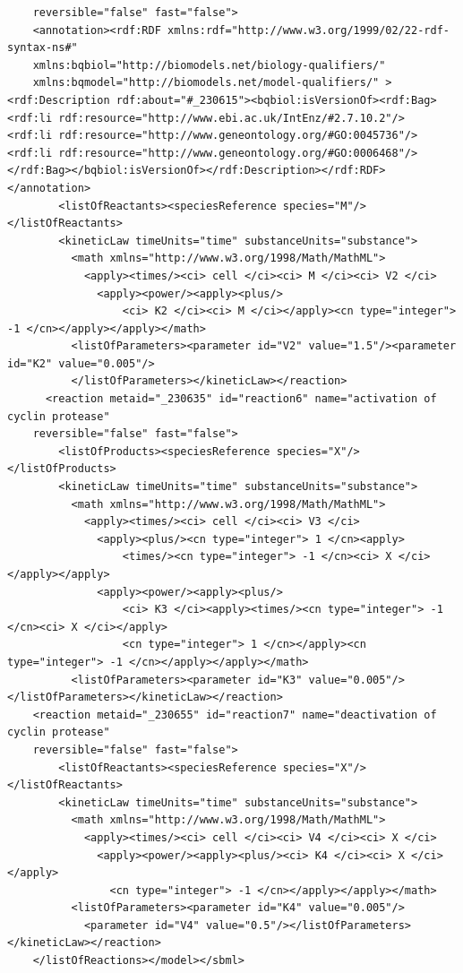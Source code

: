 \documentclass[a4paper,10pt,titlepage]{article}
\begin{document}
\begin{verbatim}
	reversible="false" fast="false">
	<annotation><rdf:RDF xmlns:rdf="http://www.w3.org/1999/02/22-rdf-syntax-ns#" 
	xmlns:bqbiol="http://biomodels.net/biology-qualifiers/" 
	xmlns:bqmodel="http://biomodels.net/model-qualifiers/" >
<rdf:Description rdf:about="#_230615"><bqbiol:isVersionOf><rdf:Bag>
<rdf:li rdf:resource="http://www.ebi.ac.uk/IntEnz/#2.7.10.2"/>
<rdf:li rdf:resource="http://www.geneontology.org/#GO:0045736"/>
<rdf:li rdf:resource="http://www.geneontology.org/#GO:0006468"/>
</rdf:Bag></bqbiol:isVersionOf></rdf:Description></rdf:RDF></annotation>
        <listOfReactants><speciesReference species="M"/></listOfReactants>
        <kineticLaw timeUnits="time" substanceUnits="substance">
          <math xmlns="http://www.w3.org/1998/Math/MathML">
            <apply><times/><ci> cell </ci><ci> M </ci><ci> V2 </ci>
              <apply><power/><apply><plus/>
                  <ci> K2 </ci><ci> M </ci></apply><cn type="integer"> -1 </cn></apply></apply></math>
          <listOfParameters><parameter id="V2" value="1.5"/><parameter id="K2" value="0.005"/>
          </listOfParameters></kineticLaw></reaction>
      <reaction metaid="_230635" id="reaction6" name="activation of cyclin protease" 
	reversible="false" fast="false">
        <listOfProducts><speciesReference species="X"/></listOfProducts>
        <kineticLaw timeUnits="time" substanceUnits="substance">
          <math xmlns="http://www.w3.org/1998/Math/MathML">
            <apply><times/><ci> cell </ci><ci> V3 </ci>
              <apply><plus/><cn type="integer"> 1 </cn><apply>
                  <times/><cn type="integer"> -1 </cn><ci> X </ci></apply></apply>
              <apply><power/><apply><plus/>
                  <ci> K3 </ci><apply><times/><cn type="integer"> -1 </cn><ci> X </ci></apply>
                  <cn type="integer"> 1 </cn></apply><cn type="integer"> -1 </cn></apply></apply></math>
          <listOfParameters><parameter id="K3" value="0.005"/></listOfParameters></kineticLaw></reaction>
	<reaction metaid="_230655" id="reaction7" name="deactivation of cyclin protease" 
	reversible="false" fast="false">
        <listOfReactants><speciesReference species="X"/></listOfReactants>
        <kineticLaw timeUnits="time" substanceUnits="substance">
          <math xmlns="http://www.w3.org/1998/Math/MathML">
            <apply><times/><ci> cell </ci><ci> V4 </ci><ci> X </ci>
              <apply><power/><apply><plus/><ci> K4 </ci><ci> X </ci></apply>
                <cn type="integer"> -1 </cn></apply></apply></math>
          <listOfParameters><parameter id="K4" value="0.005"/>
            <parameter id="V4" value="0.5"/></listOfParameters></kineticLaw></reaction>
    </listOfReactions></model></sbml>


\end{verbatim} 
\end{document}
